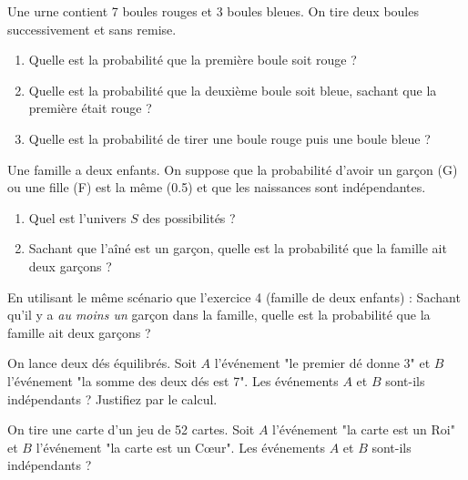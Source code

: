 \begin{exercicebox}
Une urne contient 7 boules rouges et 3 boules bleues. On tire deux boules successivement et sans remise.
\begin{enumerate}
    \item Quelle est la probabilité que la première boule soit rouge ?
    \item Quelle est la probabilité que la deuxième boule soit bleue, sachant que la première était rouge ?
    \item Quelle est la probabilité de tirer une boule rouge puis une boule bleue ?
\end{enumerate}
\end{exercicebox}

\begin{exercicebox}
Une famille a deux enfants. On suppose que la probabilité d'avoir un garçon (G) ou une fille (F) est la même (0.5) et que les naissances sont indépendantes.
\begin{enumerate}
    \item Quel est l'univers $S$ des possibilités ?
    \item Sachant que l'aîné est un garçon, quelle est la probabilité que la famille ait deux garçons ?
\end{enumerate}
\end{exercicebox}

\begin{exercicebox}
En utilisant le même scénario que l'exercice 4 (famille de deux enfants) :
Sachant qu'il y a \textit{au moins un} garçon dans la famille, quelle est la probabilité que la famille ait deux garçons ?
\end{exercicebox}


\begin{exercicebox}
On lance deux dés équilibrés.
Soit $A$ l'événement "le premier dé donne 3" et $B$ l'événement "la somme des deux dés est 7".
Les événements $A$ et $B$ sont-ils indépendants ? Justifiez par le calcul.
\end{exercicebox}

\begin{exercicebox}
On tire une carte d'un jeu de 52 cartes.
Soit $A$ l'événement "la carte est un Roi" et $B$ l'événement "la carte est un Cœur".
Les événements $A$ et $B$ sont-ils indépendants ?
\end{exercicebox}

